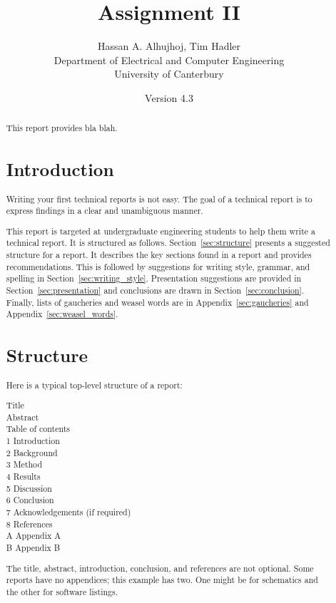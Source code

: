 \documentclass[a4paper,12pt]{article}
\title{\vspace{-1cm} Assignment II}
\author{Hassan A. Alhujhoj, Tim Hadler \\
        \small Department of Electrical and Computer Engineering\\
        \small University of Canterbury}
\date{\small Version 4.3}
\newcommand{\refsec}[1]{\mbox{Section~\ref{sec:#1}}}
\newcommand{\refapp}[1]{\mbox{Appendix~\ref{sec:#1}}}
\begin{document}
\maketitle

\begin{abstract}

This report provides bla blah.


\tableofcontents


\section{Introduction}

Writing your first technical reports is not easy.  The goal of a
technical report is to express findings in a clear and unambiguous
manner.

This report is targeted at undergraduate engineering students to help
them write a technical report.  It is structured as follows.
\refsec{structure} presents a suggested structure for a report.  It
describes the key sections found in a report and provides
recommendations.  This is followed by suggestions for writing style,
grammar, and spelling in \refsec{writing_style}.  Presentation
suggestions are provided in \refsec{presentation} and conclusions are
drawn in \refsec{conclusion}.  Finally, lists of gaucheries and weasel
words are in \refapp{gaucheries} and \refapp{weasel_words}.




\section{Structure}
\label{sec:structure}

Here is a typical top-level structure of a report:
\begin{flushleft}
  Title\\
  Abstract\\
  Table of contents\\
  1 Introduction\\
  2 Background\\
  3 Method\\
  4 Results\\
  5 Discussion\\
  6 Conclusion\\
  7 Acknowledgements (if required)\\
  8 References\\
  A Appendix A\\
  B Appendix B\\
\end{flushleft}
%
The title, abstract, introduction, conclusion, and references are not
optional.  Some reports have no appendices; this example has two.  One
might be for schematics and the other for software listings.



\end{abstract}
\end{document}

